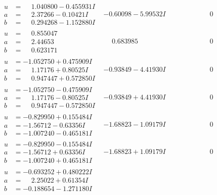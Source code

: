 \documentclass[1p]{elsarticle_modified}
\theoremstyle{definition}
\begin{document}
$$\begin{array}{c|c|c}
\begin{aligned}
u &= \phantom{-}1.040800 - 0.455931 I \\
a &= \phantom{-}2.37266 - 0.10421 I \\
b &= \phantom{-}0.294268 - 1.152880 I\end{aligned}
 & -0.60098 - 5.99532 I & \phantom{-0.000000 } 0 \\ \hline\begin{aligned}
u &= \phantom{-}0.855047\phantom{ +0.000000I} \\
a &= \phantom{-}2.44653\phantom{ +0.000000I} \\
b &= \phantom{-}0.623171\phantom{ +0.000000I}\end{aligned}
 & \phantom{-}0.683985\phantom{ +0.000000I} & \phantom{-0.000000 } 0 \\ \hline\begin{aligned}
u &= -1.052750 + 0.475909 I \\
a &= \phantom{-}1.17176 + 0.80525 I \\
b &= \phantom{-}0.947447 + 0.572850 I\end{aligned}
 & -0.93849 - 4.41930 I & \phantom{-0.000000 } 0 \\ \hline\begin{aligned}
u &= -1.052750 - 0.475909 I \\
a &= \phantom{-}1.17176 - 0.80525 I \\
b &= \phantom{-}0.947447 - 0.572850 I\end{aligned}
 & -0.93849 + 4.41930 I & \phantom{-0.000000 } 0 \\ \hline\begin{aligned}
u &= -0.829950 + 0.155484 I \\
a &= -1.56712 - 0.63356 I \\
b &= -1.007240 - 0.465181 I\end{aligned}
 & -1.68823 - 1.09179 I & \phantom{-0.000000 } 0 \\ \hline\begin{aligned}
u &= -0.829950 - 0.155484 I \\
a &= -1.56712 + 0.63356 I \\
b &= -1.007240 + 0.465181 I\end{aligned}
 & -1.68823 + 1.09179 I & \phantom{-0.000000 } 0 \\ \hline\begin{aligned}
u &= -0.693252 + 0.480222 I \\
a &= \phantom{-}2.25022 + 0.61354 I \\
b &= -0.188654 - 1.271180 I\end{aligned}

\end{array}$$
\end{document}

